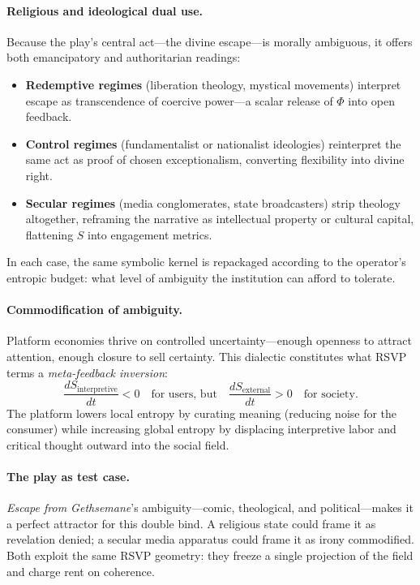 \documentclass[12pt]{article}
\begin{document}
\paragraph{Religious and ideological dual use.}
Because the play’s central act—the divine escape—is morally ambiguous, it offers both emancipatory and authoritarian readings:
\begin{itemize}
  \item \textbf{Redemptive regimes} (liberation theology, mystical movements) interpret escape as transcendence of coercive power—a scalar release of \(\Phi\) into open feedback.
  \item \textbf{Control regimes} (fundamentalist or nationalist ideologies) reinterpret the same act as proof of chosen exceptionalism, converting flexibility into divine right.
  \item \textbf{Secular regimes} (media conglomerates, state broadcasters) strip theology altogether, reframing the narrative as intellectual property or cultural capital, flattening \(S\) into engagement metrics.
\end{itemize}
In each case, the same symbolic kernel is repackaged according to the operator’s entropic budget: what level of ambiguity the institution can afford to tolerate.

\paragraph{Commodification of ambiguity.}
Platform economies thrive on controlled uncertainty—enough openness to attract attention, enough closure to sell certainty.  
This dialectic constitutes what RSVP terms a \emph{meta-feedback inversion}:
\[
\frac{dS_{\text{interpretive}}}{dt} < 0 \quad \text{for users, but} \quad \frac{dS_{\text{external}}}{dt} > 0 \quad \text{for society}.
\]
The platform lowers local entropy by curating meaning (reducing noise for the consumer) while increasing global entropy by displacing interpretive labor and critical thought outward into the social field.

\paragraph{The play as test case.}
\emph{Escape from Gethsemane}’s ambiguity—comic, theological, and political—makes it a perfect attractor for this double bind.  
A religious state could frame it as revelation denied; a secular media apparatus could frame it as irony commodified.  
Both exploit the same RSVP geometry: they freeze a single projection of the field and charge rent on coherence.
\end{document}

